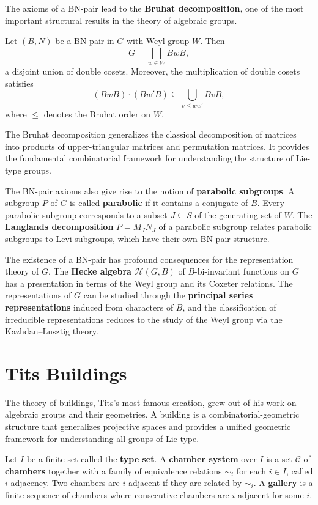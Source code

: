 The axioms of a BN-pair lead to the \textbf{Bruhat decomposition}, one of the most important structural results in the theory of algebraic groups.

\begin{theorem}
Let \((B, N)\) be a BN-pair in \(G\) with Weyl group \(W\). Then
\[
G = \bigsqcup_{w \in W} B w B,
\]
a disjoint union of double cosets. Moreover, the multiplication of double cosets satisfies
\[
(B w B) \cdot (B w' B) \subseteq \bigcup_{v \leq w w'} B v B,
\]
where \(\leq\) denotes the Bruhat order on \(W\).
\end{theorem}

The Bruhat decomposition generalizes the classical decomposition of matrices into products of upper-triangular matrices and permutation matrices. It provides the fundamental combinatorial framework for understanding the structure of Lie-type groups.

The BN-pair axioms also give rise to the notion of \textbf{parabolic subgroups}. A subgroup \(P\) of \(G\) is called \textbf{parabolic} if it contains a conjugate of \(B\). Every parabolic subgroup corresponds to a subset \(J \subseteq S\) of the generating set of \(W\). The \textbf{Langlands decomposition} \(P = M_J N_J\) of a parabolic subgroup relates parabolic subgroups to Levi subgroups, which have their own BN-pair structure.

The existence of a BN-pair has profound consequences for the representation theory of \(G\). The \textbf{Hecke algebra} \(\mathcal{H}(G, B)\) of \(B\)-bi-invariant functions on \(G\) has a presentation in terms of the Weyl group and its Coxeter relations. The representations of \(G\) can be studied through the \textbf{principal series representations} induced from characters of \(B\), and the classification of irreducible representations reduces to the study of the Weyl group via the Kazhdan--Lusztig theory.

\section{Tits Buildings}

The theory of buildings, Tits's most famous creation, grew out of his work on algebraic groups and their geometries. A building is a combinatorial-geometric structure that generalizes projective spaces and provides a unified geometric framework for understanding all groups of Lie type.

\begin{definition}
Let \(I\) be a finite set called the \textbf{type set}. A \textbf{chamber system} over \(I\) is a set \(\mathcal{C}\) of \textbf{chambers} together with a family of equivalence relations \(\sim_i\) for each \(i \in I\), called \(i\)-adjacency. Two chambers are \(i\)-adjacent if they are related by \(\sim_i\). A \textbf{gallery} is a finite sequence of chambers where consecutive chambers are \(i\)-adjacent for some \(i\).
\end{definition}

